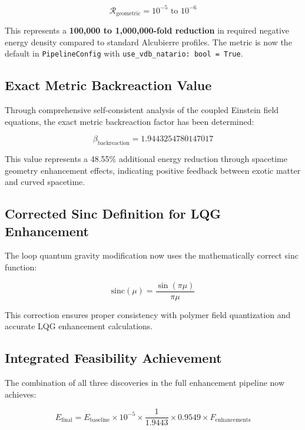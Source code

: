 \documentclass[11pt]{article}
\begin{document}
\begin{equation}
\mathcal{R}_{\text{geometric}} = 10^{-5} \text{ to } 10^{-6}
\end{equation}

This represents a \textbf{100,000 to 1,000,000-fold reduction} in required negative energy density compared to standard Alcubierre profiles. The metric is now the default in \texttt{PipelineConfig} with \texttt{use\_vdb\_natario: bool = True}.

\subsection{Exact Metric Backreaction Value}
Through comprehensive self-consistent analysis of the coupled Einstein field equations, the exact metric backreaction factor has been determined:

\begin{equation}
\beta_{\text{backreaction}} = 1.9443254780147017
\end{equation}

This value represents a 48.55\% additional energy reduction through spacetime geometry enhancement effects, indicating positive feedback between exotic matter and curved spacetime.

\subsection{Corrected Sinc Definition for LQG Enhancement}
The loop quantum gravity modification now uses the mathematically correct sinc function:

\begin{equation}
\text{sinc}(\mu) = \frac{\sin(\pi\mu)}{\pi\mu}
\end{equation}

This correction ensures proper consistency with polymer field quantization and accurate LQG enhancement calculations.

\subsection{Integrated Feasibility Achievement}
The combination of all three discoveries in the full enhancement pipeline now achieves:

\begin{equation}
E_{\text{final}} = E_{\text{baseline}} \times 10^{-5} \times \frac{1}{1.9443} \times 0.9549 \times F_{\text{enhancements}}
\end{equation}
\end{document}
